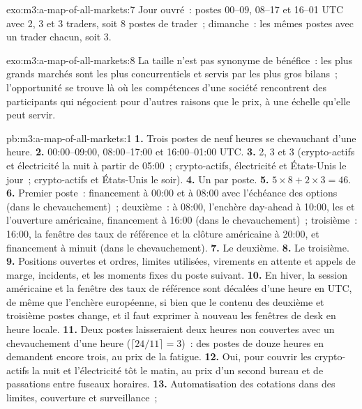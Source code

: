 \begin{solution}{exo:m3:a-map-of-all-markets:7}
Jour ouvré~: postes 00--09, 08--17 et 16--01 UTC avec 2, 3 et 3 traders, soit 8 postes de trader~; dimanche~: les mêmes postes avec un trader chacun, soit 3.
\end{solution}

\begin{solution}{exo:m3:a-map-of-all-markets:8}
La taille n'est pas synonyme de bénéfice~: les plus grands marchés sont les plus concurrentiels et servis par les plus gros bilans~; l'opportunité se trouve là où les compétences d'une société
rencontrent des participants qui négocient pour d'autres raisons que le prix, à une échelle qu'elle peut servir.
\end{solution}

\begin{solution}{pb:m3:a-map-of-all-markets:1}
\textbf{1.} Trois postes de neuf heures se chevauchant d'une heure. \textbf{2.} 00:00--09:00, 08:00--17:00 et 16:00--01:00 UTC. \textbf{3.} 2, 3 et 3
(crypto-actifs et électricité la nuit à partir de 05:00~; crypto-actifs, électricité et États-Unis le jour~; crypto-actifs et États-Unis le soir). \textbf{4.} Un par poste. \textbf{5.} $5
\times 8 + 2 \times 3 = 46$. \textbf{6.} Premier poste~: financement à 00:00 et à 08:00 avec l'échéance des options (dans le chevauchement)~; deuxième~: à 08:00,
l'enchère day-ahead à 10:00, les  et l'ouverture américaine, financement à 16:00 (dans le chevauchement)~; troisième~: 16:00, la fenêtre des taux de référence
et la clôture américaine à 20:00, et financement à minuit (dans le chevauchement). \textbf{7.} Le deuxième. \textbf{8.} Le troisième. \textbf{9.} Positions ouvertes et
ordres, limites utilisées, virements en attente et appels de marge, incidents, et les moments fixes du poste suivant. \textbf{10.} En hiver, la session américaine
et la fenêtre des taux de référence sont décalées d'une heure en UTC, de même que l'enchère européenne, si bien que le contenu des deuxième et troisième postes change, et
il faut exprimer à nouveau les fenêtres de desk en heure locale. \textbf{11.} Deux postes laisseraient deux heures non couvertes avec un chevauchement d'une heure
($\lceil 24/11 \rceil = 3$)~: des postes de douze heures en demandent encore trois, au prix de la fatigue. \textbf{12.} Oui, pour couvrir les crypto-actifs la nuit et
l'électricité tôt le matin, au prix d'un second bureau et de passations entre fuseaux horaires. \textbf{13.} Automatisation des cotations dans des limites, couverture et surveillance~;

\end{solution}

